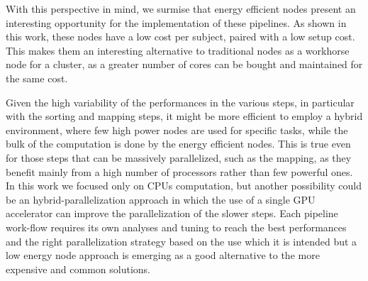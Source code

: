 \documentclass{standalone}
\begin{document}
With this perspective in mind, we surmise that energy efficient nodes present an interesting opportunity for the implementation of these pipelines.
As shown in this work, these nodes have a low cost per subject, paired with a low setup cost.
This makes them an interesting alternative to traditional nodes as a workhorse node for a cluster, as a greater number of cores can be bought and maintained for the same cost.

Given the high variability of the performances in the various steps, in particular with the sorting and mapping steps, it might be more efficient to employ a hybrid environment, where few high power nodes are used for specific tasks, while the bulk of the computation is done by the energy efficient nodes.
This is true even for those steps that can be massively parallelized, such as the mapping, as they benefit mainly from a high number of processors rather than few powerful ones.
In this work we focused only on CPUs computation, but another possibility could be an hybrid-parallelization approach in which the use of a single GPU accelerator can improve the parallelization of the slower steps.
Each pipeline work-flow requires its own analyses and tuning to reach the best performances and the right parallelization strategy based on the use which it is intended but a low energy node approach is emerging as a good alternative to the more expensive and common solutions.
\end{document}
